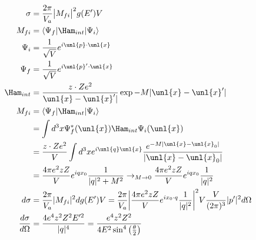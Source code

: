 \documentclass[a4paper, 11pt, normalem]{report}
\begin{document}
\begin{itemize}
\begin{align}
            \sigma &= \frac{2\pi}{V_a}\big|M_{fi}\big|^2 g(E')V \\
            M_{fi} &= \langle \Psi_f | \Ham_{int} | \Psi_i \rangle \\
            \Psi_i &= \frac{1}{\sqrt{V}} e^{i\unl{p}\cdot\unl{x}} \\
            \Psi_f &= \frac{1}{\sqrt{V}} e^{i\unl{p}'\cdot\unl{x}} \\
            \Ham_{int} &= \frac{z\cdot Ze^2}{\unl{x} - \unl{x}'|}\exp{-M|\unl{x}-\unl{x}'|} \\
            M_{fi} &= \langle \Psi_f | \Ham_{int} | \Psi_i \rangle \\
                   &= \int d^3x \Psi^*_f(\unl{x}) \Ham_{int} \Psi_i(\unl{x}) \\
                   &= \frac{z\cdot Ze^2}{V} \int d^3x e^{i\unl{q}\unl{x}} \frac{e^{-M|\unl{x}-\unl{x}_0|}}{|\unl{x}-\unl{x}_0|} \\
                   &= \frac{4\pi e^2 zZ}{V} e^{iqx_0} \frac{1}{|q|^2 + M^2} \to_{M\to 0} \frac{4\pi e^2 zZ}{V} e^{iqx_0}\frac{1}{|q|^2} \\
            d\sigma &= \frac{2\pi}{V_a} |M_{fi}|^2 dg(E') V = \frac{2\pi}{V_a} \bigg|\frac{4\pi e^2 zZ}{V} e^{ix_0\cdot q} \frac{1}{|q|^2}\bigg|^2 V\frac{V}{(2\pi)^3} |p'|^2 d\Omega \\
            \frac{d\sigma}{d\Omega} &= \frac{4e^4z^2Z^2 E'^2}{|q|^4} = \frac{e^4z^2Z^2}{4E^2\sin^4\left(\frac{\theta}{2}\right)}
        \end{align}
\end{itemize}
\end{document}
